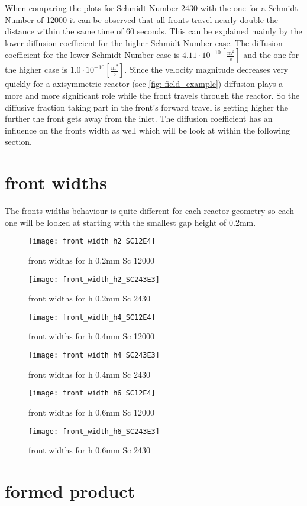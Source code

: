 \documentclass[../thesis.tex]{subfiles}
\begin{document}
When comparing the plots for Schmidt-Number 2430 with the one for a Schmidt-Number of 12000 it can be observed that all fronts travel nearly double the distance within the same time of 60 seconds. This can be explained mainly by the lower diffusion coefficient for the higher Schmidt-Number case. The diffusion coefficient for the lower Schmidt-Number case is $4 \text{.}11 \cdot 10^{-10} \left[ \frac{\mathrm{m^2}}{\mathrm{s}} \right]$ and the one for the higher case is $1\text{.}0 \cdot 10^{-10} \left[ \frac{\mathrm{m^2}}{\mathrm{s}} \right]$.
Since the velocity magnitude decreases very quickly for a axisymmetric reactor (see \autoref{fig: field_example}) diffusion plays a more and more significant role while the front travels through the reactor. So the diffusive fraction taking part in the front's forward travel is getting higher the further the front gets away from the inlet. The diffusion coefficient has an influence on the fronts width as well which will be look at within the following section.

\section{front widths}

The fronts widths behaviour is quite different for each reactor geometry so each one will be looked at starting with the smallest gap height of 0.2mm.  

\begin{figure}[htbp]
	\centering
	\texttt{[image: front\_width\_h2\_SC12E4]}
	\caption{front widths for h 0.2mm Sc 12000\label{fig: front_width_h2_SC12E4}}\bigskip
	\texttt{[image: front\_width\_h2\_SC243E3]}
	\caption{front widths for h 0.2mm Sc 2430\label{fig: front_width_pos_h2_SC243E3}}
\end{figure}

\begin{figure}[htbp]
	\centering
	\texttt{[image: front\_width\_h4\_SC12E4]}
	\caption{front widths for h 0.4mm Sc 12000\label{fig: front_width_h4_SC12E4}}\bigskip
	\texttt{[image: front\_width\_h4\_SC243E3]}
	\caption{front widths for h 0.4mm Sc 2430\label{fig: front_width_pos_h4_SC243E3}}
\end{figure}

\begin{figure}[htbp]
	\centering
	\texttt{[image: front\_width\_h6\_SC12E4]}
	\caption{front widths for h 0.6mm Sc 12000\label{fig: front_width_h6_SC12E4}}\bigskip
	\texttt{[image: front\_width\_h6\_SC243E3]}
	\caption{front widths for h 0.6mm Sc 2430\label{fig: front_width_pos_h6_SC243E3}}
\end{figure}

\section{formed product}
\end{document}
